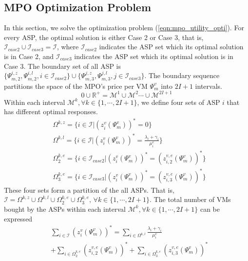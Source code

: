 \documentclass[conference]{IEEEtran}
\begin{document}

\subsection{MPO Optimization Problem}
In this section, we solve the optimization problem (\ref{eqn:mpo_utility_opti}). For every ASP, the optimal solution is either Case 2 or Case 3, that is, $\mathcal{I}_{case2} \cup \mathcal{I}_{case3} = \mathcal{I}$, where $\mathcal{I}_{case2}$ indicates the ASP set which its optimal solution is in Case 2, and $\mathcal{I}_{case3}$ indicates the ASP set which its optimal solution is in Case 3. The boundary set of all ASP is $\{\Psi_{m,2}^{i,z}, \Psi_{m,2}^{i,l}, i\in \mathcal{I}_{case2} \}\cup \{\Psi_{m,3}^{j,z}, \Psi_{m,3}^{j,l}, j\in \mathcal{I}_{case3}\}$.
The boundary sequence partitions the space of the MPO's price per VM $\Psi_m^v$ into $2I + 1$ intervals.
\begin{equation}
0 \cup \mathbb{R}^{+} = \mathcal{M}^1 \cup \mathcal{M}^2 \cdots \cup \mathcal{M}^{2I+1}
\end{equation}
Within each interval $\mathcal{M}^k, \forall k \in \{1, \cdots, 2I+1\}$, we define four sets of ASP $i$ that has different optimal responses.
\begin{equation}
\begin{aligned}
&\Omega^{k,z} = \{i \in \mathcal{I}|(z_{i}^v(\Psi_m^v))^* = 0\} \\
&\Omega^{k,l} = \{i \in \mathcal{I}|(z_{i}^v(\Psi_m^v))^* = \frac{\lambda_i + \gamma_i}{\mu_i^v}\} \\
&\Omega^{k,e}_{2} = \{i \in \mathcal{I}_{case2}|(z_{i}^v(\Psi_m^v))^* = (z_{i,2}^{v,e}(\Psi_m^v))^*\}\\
&\Omega^{k,e}_{3} = \{i \in \mathcal{I}_{case3}|(z_{i}^v(\Psi_m^v))^* = (z_{i,3}^{v,e}(\Psi_m^v))^*\}
\end{aligned}
\end{equation}
These four sets form a partition of the all ASPs. That is, $\mathcal{I} = \Omega^{k,z} \cup \Omega^{k,l} \cup \Omega^{k,e}_{2} \cup \Omega^{k,e}_{3}, \, \forall k \in \{1, \cdots, 2I+1\}$. The total number of VMs bought by the ASPs within each interval $\mathcal{M}^k, \forall k \in \{1, \cdots, 2I+1\}$ can be expressed
\begin{equation}\label{eqn:total_number_VM}
\begin{aligned}
&\sum_{i \in \mathcal{I}} (z_{i}^v(\Psi_m^v))^* =
\sum_{i\in \Omega^{k,l}}\frac{\lambda_i + \gamma_i}{\mu_i^v} \\
& + \sum_{i\in \Omega^{k,e}_{2}}(z_{i,2}^{v,e}(\Psi_m^v))^* + \sum_{i \in \Omega_3^{k,e}}(z_{i,3}^{v,e}(\Psi_m^v))^*
\end{aligned}
\end{equation}
\end{document}
